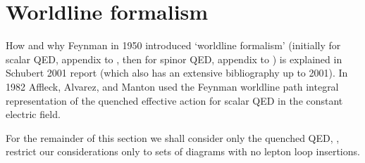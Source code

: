 
\section{Worldline formalism}
\label{sect:worldline}

How and why Feynman in 1950 introduced `worldline formalism' (initially
for scalar QED, appendix to , then for spinor QED,
appendix to ) is explained in Schubert 2001
report (which also has an extensive bibliography up to
2001).
In 1982 Affleck, Alvarez, and Manton used the Feynman
worldline path integral representation of the quenched effective action
for scalar QED in the constant electric field.

For the remainder of this section we shall consider only the quenched
QED, \ie, restrict our considerations only to sets of diagrams with no
lepton loop insertions.

